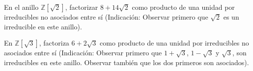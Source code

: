 \begin{ejercicio}
    En el anillo $\mathbb{Z}\left[\sqrt{2}\right]$, factorizar $8+14\sqrt{2}$ como producto de una unidad por irreducibles no asociados entre sí (Indicación: Observar primero que $\sqrt{2}$ es un irreducible en este anillo).
\end{ejercicio}

\begin{ejercicio}
    En $\mathbb{Z}\left[\sqrt{3}\right]$, factoriza $6+2\sqrt{3}$ como producto de una unidad por irreducibles no asociados entre sí (Indicación: Observar primero que $1+\sqrt{3}$, $1-\sqrt{3}$ y $\sqrt{3}$, son irreducibles en este anillo. Observar también que los dos primeros son asociados).
\end{ejercicio}

